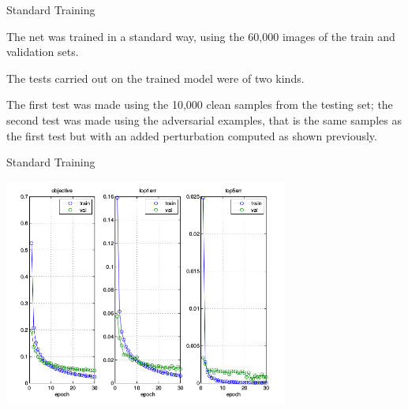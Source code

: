 \begin{tframe}{Standard Training}

The net was trained in a standard way, using the 60,000 images of the train and validation sets.

\vspace{0.1in}

The tests carried out on the trained model were of two kinds. 

\vspace{0.1in}

The first test was made using the 10,000 clean samples from the testing set; the second test was made using the adversarial examples, that is the same samples as the first test but with an added perturbation computed as shown previously.

\end{tframe}

\begin{tframe}{Standard Training}

\begin{center}
  \includegraphics[width=0.7\textwidth]{img/train-base.png}
	\label{train-base} 
\end{center}
\end{tframe}

